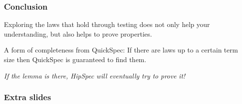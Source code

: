 \documentclass[serif,professionalfont]{beamer}
\newcommand\dn[0]{\vspace{\baselineskip}}
\begin{document}
\begin{frame}[fragile]
  \frametitle{Conclusion}

  Exploring the laws that hold through testing does not only help your
  understanding, but also helps to prove properties.

  \dn

  A form of completeness from QuickSpec: If there are laws up to a
  certain term size then QuickSpec is guaranteed to find them.

  \dn

  \emph{If the lemma is there, HipSpec will eventually try to prove it!}

\end{frame}

\begin{frame}[fragile]
  \frametitle{Extra slides}
\end{frame}
\end{document}
